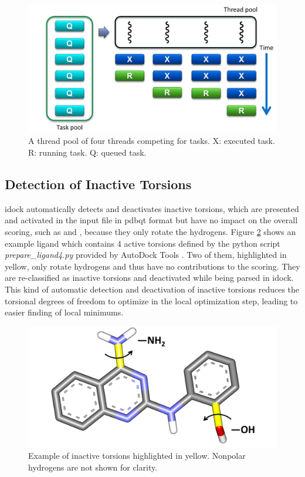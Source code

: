 \begin{figure}
\centering
\includegraphics[width=\linewidth]{idock/ThreadPool.png}
\caption{A thread pool of four threads competing for tasks. X: executed task. R: running task. Q: queued task.}
\label{idock:ThreadPool}
\end{figure}

\subsection{Detection of Inactive Torsions}

idock automatically detects and deactivates inactive torsions, which are presented and activated in the input file in pdbqt format but have no impact on the overall scoring, such as  and , because they only rotate the hydrogens. Figure \ref{idock:InactiveTorsions} shows an example ligand which contains 4 active torsions defined by the python script \textit{prepare\_ligand4.py} provided by AutoDock Tools \cite{785,596}. Two of them, highlighted in yellow, only rotate hydrogens and thus have no contributions to the scoring. They are re-classified as inactive torsions and deactivated while being parsed in idock. This kind of automatic detection and deactivation of inactive torsions reduces the torsional degrees of freedom to optimize in the local optimization step, leading to easier finding of local minimums.

\begin{figure}
\centering
\includegraphics[width=\linewidth]{idock/InactiveTorsions.png}
\caption{Example of inactive torsions highlighted in yellow. Nonpolar hydrogens are not shown for clarity.}
\label{idock:InactiveTorsions}
\end{figure}

